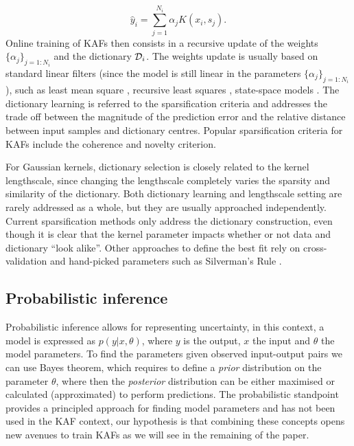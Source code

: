 \begin{equation}
\hat{y}_i = \sum_{j=1}^{N_i} \alpha_j K(x_i, s_j).
\end{equation}
Online training of KAFs then consists in a recursive update of the weights $\{\alpha_{j}\}_{j=1:N_i}$ and the dictionary $\mathcal{D}_i$. The weights update is usually based on standard linear filters (since the model is still linear in the parameters $\{\alpha_{j}\}_{j=1:N_i}$), such as least mean square \cite{liu08,richard09}, recursive least squares \cite{engel04}, state-space models \cite{tobar15a}. The dictionary learning is referred to the sparsification criteria \cite{honeine15} and addresses the trade off between the magnitude of the prediction error and the relative distance between input samples and dictionary centres. Popular sparsification criteria for KAFs include the coherence \cite{richard09} and novelty \cite{platt91} criterion. 

For Gaussian kernels, dictionary selection is closely related to the kernel lengthscale, since changing the lengthscale completely varies the sparsity and similarity of the dictionary. Both dictionary learning and lengthscale setting are rarely addressed as a whole, but they are usually approached independently. Current sparsification methods only address the dictionary construction, even though it is clear that the kernel parameter impacts whether or not data and dictionary ``look alike''. Other approaches to define the best fit rely on cross-validation and hand-picked parameters such as Silverman's Rule \cite{silverman1986density}.

\subsection{Probabilistic inference} %
\label{sub:inference}
Probabilistic inference allows for representing uncertainty, in this context, a model is expressed as $p(y|x,\theta)$, where $y$ is the output, $x$ the input and $\theta$ the model parameters. To find the parameters given observed input-output pairs we can use Bayes theorem, which requires to define a \textit{prior} distribution on the parameter $\theta$, where then the \textit{posterior} distribution can be either maximised or calculated (approximated) to perform predictions. The probabilistic standpoint provides a principled approach for finding model parameters and has not been used in the KAF context, our hypothesis is that combining these concepts opens new avenues to train KAFs as we will see in the remaining of the paper.
